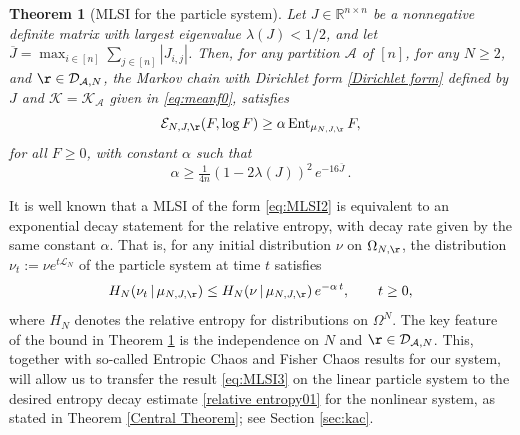 \documentclass[11pt,reqno]{amsart}
\numberwithin{equation}{section}
\numberwithin{figure}{section}
\newtheorem{theorem}{Theorem}[section]
\renewcommand{\geq}{\ge} %
\newcommand{\1}{\mathds{1}}
\newcommand{\tc}{\,|\,}
\let\a=\alpha \let\b=\beta \let\g=\gamma \let\d=\delta
\let\O=\Omega
\newcommand{\cA}{\ensuremath{\mathcal A}}
\newcommand{\cD}{\ensuremath{\mathcal D}}
\newcommand{\cK}{\ensuremath{\mathcal K}}
\newcommand{\cL}{\ensuremath{\mathcal L}}
\newcommand{\bbR}{{\ensuremath{\mathbb R}} }
\begin{document}
\begin{theorem}[MLSI for the particle system]\label{th:MLSI}
Let \(J\in\bbR^{n\times n}\) be a nonnegative definite matrix with largest eigenvalue \(\lambda(J) < 1/2\), and let  \(\overline{J}=\max_{i\in [n]} \sum_{j\in [n]}|J_{i,j}|\). 
Then, %
for any partition $\cA$ of $[n]$, for any $N\ge 2$, and $\r\in \cD_{\cA,N}$, the Markov chain with Dirichlet form \eqref{Dirichlet form} defined by $J$ and $\cK=\cK_\cA$ given in \eqref{eq:meanf0},  satisfies 
\begin{equation}\label{eq:MLSI1}
\mathcal{E}_{N, J,\r}(F, \log F) \ge \a\operatorname{Ent}_{\mu_{N,J,\r}}F,
\end{equation}
for all $F\ge 0$, with constant  $\a$ such that  
  \begin{equation}\label{eq:MLSI2}
        \alpha \geq \tfrac1{4n}(1 - 2\lambda(J))^2\,e^{-16\overline{J}}\,.
   \end{equation}
\end{theorem}
It is well known that a MLSI of the form \eqref{eq:MLSI2} is equivalent to an exponential decay statement for the relative entropy, with decay rate given by the same constant $\a$. That is, for any initial distribution $\nu$ on $ \O_{N,\r}$, the distribution $\nu_t:=\nu e^{t\cL_N}$ of the particle system at time $t$ satisfies 
    \begin{equation}\label{eq:MLSI3}
      H_N( \nu_t\tc  \mu_{N,J,\r}) \le H_N( \nu \tc  \mu_{N,J,\r})\,e^{- \alpha\,t},\qquad t\ge 0, 
   \end{equation}
   where $ H_N$ denotes the relative entropy for distributions on $\O^N$.  
The key feature of the bound in Theorem \ref{th:MLSI} is the independence on $N$ and $\r\in \cD_{\cA,N}$. This, together with so-called Entropic Chaos and Fisher Chaos results for our system, will allow us to transfer the result \eqref{eq:MLSI3} on the linear particle system to the desired entropy decay estimate \eqref{relative entropy01} for the nonlinear system, as stated in Theorem \ref{Central Theorem}; see Section \ref{sec:kac}. 
\end{document}
